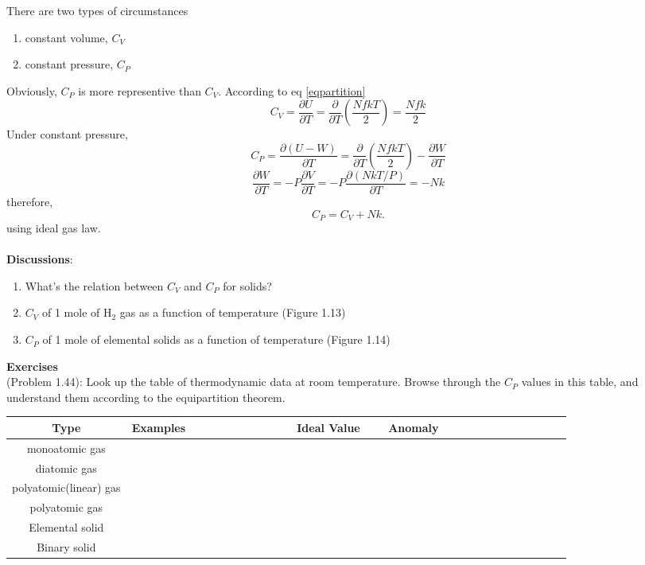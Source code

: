 \documentclass[twoside]{article}
\begin{document}
There are two types of circumstances
\begin{enumerate}
\item{constant volume}, $C_V$
\item{constant pressure}, $C_P$
\end{enumerate}
Obviously, $C_P$ is more representive than $C_V$.
According to eq \ref{eqpartition}
  \begin{equation} C_V = \frac{\partial U}{\partial{T}} 
                       = \frac{\partial} {\partial{T}}(\frac {NfkT}{2})
                       = \frac{Nfk}{2}
  \end{equation}
Under constant pressure,
  \begin{equation} C_P = \frac{\partial (U-W)} {\partial{T}} 
                       = \frac{\partial} {\partial{T}}(\frac {NfkT}{2}) - \frac{\partial W}{\partial{T}}
  \end{equation}
  \begin{equation}
                \frac{\partial W}{\partial{T}} = -P\frac{\partial V}{\partial T} 
                                                = -P\frac{\partial (NkT/P)}{\partial T} 
                                                = -Nk
  \end{equation}
therefore, 
  \begin{equation} C_P = C_V + Nk. \end{equation}
using ideal gas law.\\\\

{\bf Discussions}: 
\begin{enumerate}
\item{What's the relation between $C_V$ and $C_P$ for solids?}
\item{$C_V$ of 1 mole of H$_2$ gas as a function of temperature (Figure 1.13)}
\item{$C_P$ of 1 mole of elemental solids as a function of temperature (Figure 1.14)}
\end{enumerate}

{\bf Exercises}\\
(Problem 1.44): Look up the table of thermodynamic data at room temperature. Browse through the $C_P$ values in this table, and understand them according to the equipartition theorem.\\
\begin{tabular}{|c | c | c | c |}
\hline
Type    & Examples ~~~~~~~~~~~~~~~& Ideal Value ~~& Anomaly~~~~~~~~~~~~~~~~~~~ \\\hline
monoatomic gas  &   &   &   \\\hline
diatomic gas    &   &   &   \\\hline
polyatomic(linear) gas &   &   &   \\\hline
polyatomic gas &   &   &   \\\hline
Elemental solid &   &   &   \\\hline
Binary solid &   &   &   \\\hline

\end{tabular}\\\\
\end{document}

